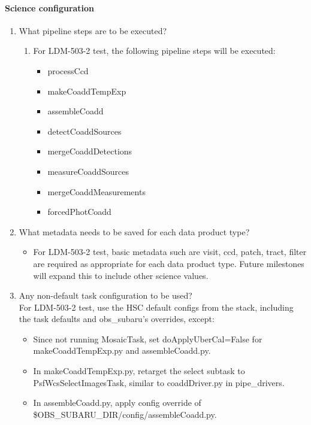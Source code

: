 \paragraph{Science configuration}
\begin{enumerate}
    \item{What pipeline steps are to be executed?}
    \begin{enumerate}
        \item{For LDM-503-2 test, the following pipeline steps will be executed: }
        \begin{itemize}
        \item{processCcd}
        \item{makeCoaddTempExp}
        \item{assembleCoadd}
        \item{detectCoaddSources}
        \item{mergeCoaddDetections}
        \item{measureCoaddSources}
        \item{mergeCoaddMeasurements}
        \item{forcedPhotCoadd}
        \end{itemize}
    \end{enumerate}
    \item{What metadata needs to be saved for each data product type?}
    \begin{itemize}
        \item{For LDM-503-2 test, basic metadata such are visit, ccd, patch, tract, filter are required as appropriate for each data product type.   Future milestones will expand this to include other science values.}
    \end{itemize}
    \item{Any non-default task configuration to be used?} \\
        For LDM-503-2 test, use the HSC default configs from the stack, 
        including the task defaults and obs{\_}subaru’s overrides, except:
        \begin{itemize}
            \item{Since not running MosaicTask, set doApplyUberCal=False for makeCoaddTempExp.py and assembleCoadd.py.}
            \item{In makeCoaddTempExp.py, retarget the select subtask to PsfWcsSelectImagesTask, similar to coaddDriver.py in pipe{\_}drivers.}
            \item{In assembleCoadd.py, apply config override of \$OBS{\_}SUBARU{\_}DIR/config/assembleCoadd.py.}
        \end{itemize}
\end{enumerate}
